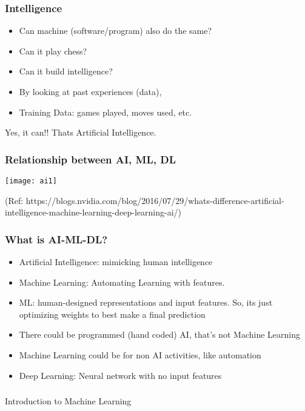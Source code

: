 \begin{frame}[fragile]\frametitle{Intelligence}
\begin{itemize}
\item Can machine (software/program) also do the same?
\item Can it play chess?
\item Can it build intelligence?
\item By looking at past experiences (data), 
\item Training Data: games played, moves used, etc.
\end{itemize}
Yes, it can!! Thats Artificial Intelligence.
\end{frame}


\begin{frame}[fragile]\frametitle{Relationship between AI, ML, DL}
\begin{center}
\texttt{[image: ai1]}
\end{center}
{\tiny (Ref: https://blogs.nvidia.com/blog/2016/07/29/whats-difference-artificial-intelligence-machine-learning-deep-learning-ai/)}
\end{frame}

\begin{frame}[fragile] \frametitle{What is AI-ML-DL?}

\begin{itemize}
\item Artificial Intelligence: mimicking human intelligence
\item Machine Learning: Automating Learning with features. 
\item ML: human-designed representations and input features.  So, its just optimizing weights to best make a final prediction
\item There could be programmed (hand coded) AI, that's not Machine Learning
\item Machine Learning could be for non AI activities, like automation
\item Deep Learning: Neural network with no input features
\end{itemize}
\end{frame}


\begin{frame}[fragile]\frametitle{}
\begin{center}
{\Large Introduction to Machine Learning}
\end{center}
\end{frame}

